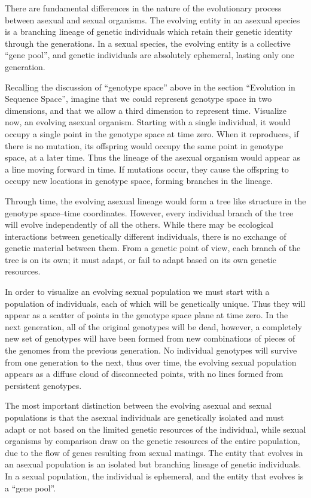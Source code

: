 There are fundamental differences in the nature of the evolutionary
process between asexual and sexual organisms.  The evolving entity in
an asexual species is a branching lineage of genetic individuals which
retain their genetic identity through the generations.  In a sexual
species, the evolving entity is a collective ``gene pool'', and genetic
individuals are absolutely ephemeral, lasting only one generation.

Recalling the discussion of ``genotype space'' above in the section
``Evolution in Sequence Space'',
imagine that we could represent genotype space in two dimensions, and
that we allow a third dimension to represent time.  Visualize now, an
evolving asexual organism.  Starting with a single individual, it would
occupy a single point in the genotype space at time zero.  When
it reproduces, if there is no mutation, its offspring would occupy
the same point in genotype space, at a later time.  Thus the lineage of
the asexual organism would appear as a line moving forward in time.  If
mutations occur, they cause the offspring to occupy new locations in
genotype space, forming branches in the lineage.

Through time, the evolving asexual lineage would form a tree like
structure in the genotype space--time coordinates.  However, every
individual branch of the tree will evolve independently of all the
others.  While there may be ecological interactions between genetically
different individuals, there is no exchange of genetic material between
them.  From a genetic point of view, each branch of the tree is on its
own; it must adapt, or fail to adapt based on its own genetic resources.

In order to visualize an evolving sexual population we must start with
a population of individuals, each of which will be genetically unique.
Thus they will appear as a scatter of points in the genotype space
plane at time zero.  In the next generation, all of the original
genotypes will be dead, however, a completely new set of genotypes will
have been formed from new combinations of pieces of the genomes from
the previous generation.  No individual genotypes will survive from
one generation to the next, thus over time, the evolving sexual population
appears as a diffuse cloud of disconnected points, with no lines formed
from persistent genotypes.

The most important distinction between the evolving asexual and sexual
populations is that the asexual individuals are genetically isolated and
must adapt or not based on the limited genetic resources of the individual,
while sexual organisms by comparison draw on the genetic resources of the
entire population, due to the flow of genes resulting from sexual matings.
The entity that evolves in an asexual population is an isolated but
branching lineage of genetic individuals.  In a sexual population, the
individual is ephemeral, and the entity that evolves is a ``gene pool''.

